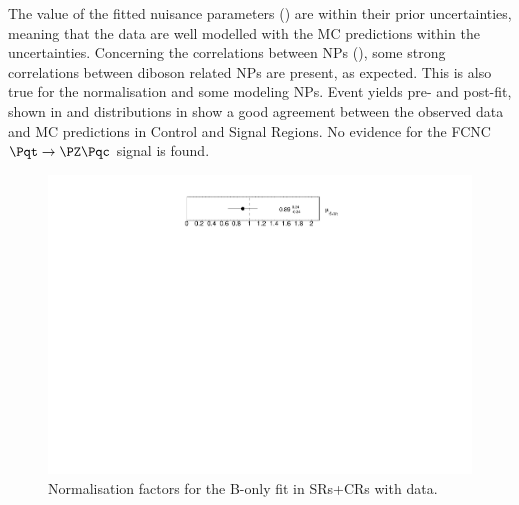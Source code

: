 The value of the fitted nuisance parameters () are within their prior uncertainties,
meaning that the data are well modelled with the MC predictions within the uncertainties.
Concerning the correlations between NPs
(), some strong correlations
between diboson related NPs are present, as expected. This is also
true for the \ttbar normalisation and some \ttbar modeling NPs. 
Event yields pre- and post-fit, shown in  and distributions in  show a good agreement between the observed data and MC predictions in Control and Signal Regions. No evidence for the FCNC $\mathrm{\Pqt\rightarrow\PZ\Pqc}$ signal is found.

\begin{figure}[htbp]
	\centering
	\includegraphics[width=.5\textwidth]{Chapters/CH8/figures/BONLY_CRSR_DL1rc_unblind/NormFactors}
	\caption{Normalisation factors for the B-only \tZc fit in SRs+CRs with data.}%
	\label{fig:stat:tzc:splusb:crsr:norm_unb}
\end{figure}

